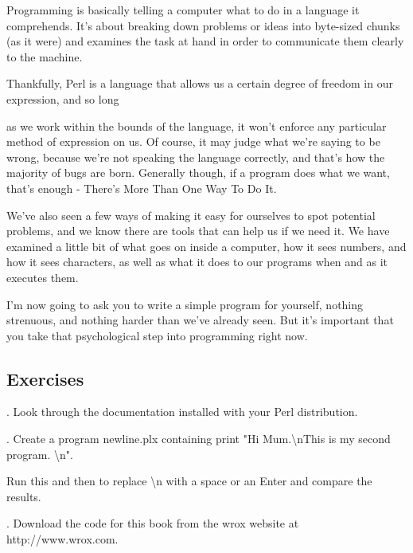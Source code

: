 \documentclass[a4paper,11pt]{book}
\begin{document}
\noindent Programming is basically telling a computer what to do in a language it comprehends. It's about breaking down problems or ideas into byte-sized chunks (as it were) and examines the task at hand in order to communicate them clearly to the machine.

\noindent 

\noindent Thankfully, Perl is a language that allows us a certain degree of freedom in our expression, and so long

\noindent as we work within the bounds of the language, it won't enforce any particular method of expression on us. Of course, it may judge what we're saying to be wrong, because we're not speaking the language correctly, and that's how the majority of bugs are born. Generally though, if a program does what we want, that's enough - There's More Than One Way To Do It.

\noindent 

\noindent We've also seen a few ways of making it easy for ourselves to spot potential problems, and we know there are tools that can help us if we need it. We have examined a little bit of what goes on inside a computer, how it sees numbers, and how it sees characters, as well as what it does to our programs when and as it executes them.

\noindent 

\noindent I'm now going to ask you to write a simple program for yourself, nothing strenuous, and nothing harder than we've already seen. But it's important that you take that psychological step into programming right now.

\noindent 

\subsection{Exercises}

\noindent 

.  Look through the documentation installed with your Perl distribution.

\noindent 

.  Create a program newline.plx containing print "Hi Mum.\textbackslash nThis is my second program. \textbackslash n".

\noindent Run this and then to replace \textbackslash n with a space or an Enter and compare the results.

\noindent 

.  Download the code for this book from the wrox website at http://www.wrox.com.
\end{document}
